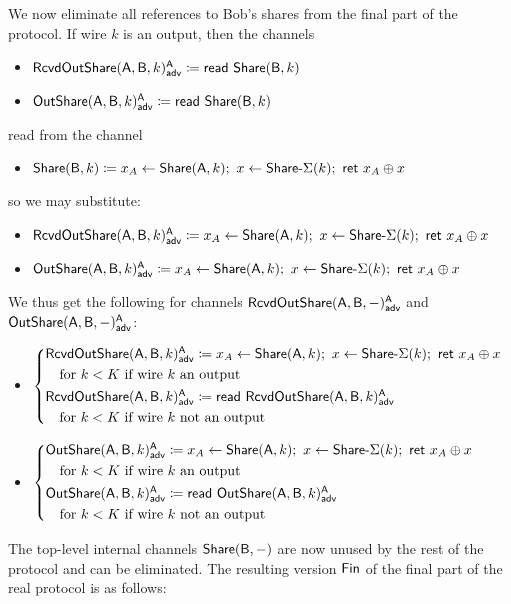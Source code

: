 \noindent We now eliminate all references to Bob's shares from the final part of the protocol. If wire $k$ is an output, then the channels
\begin{itemize}
\item {\color{blue} $\mathsf{RcvdOutShare}(\mathsf{A},\mathsf{B},k)^{\mathsf{A}}_{\mathsf{adv}} \coloneqq \mathsf{read} \ \mathsf{Share}(\mathsf{B},k)$}
\item {\color{blue} $\mathsf{OutShare}(\mathsf{A},\mathsf{B},k)^{\mathsf{A}}_{\mathsf{adv}} \coloneqq \mathsf{read} \ \mathsf{Share}(\mathsf{B},k)$}
\end{itemize}
read from the channel
\begin{itemize}
\item $\mathsf{Share}(\mathsf{B},k) \coloneqq x_A \leftarrow \mathsf{Share}(\mathsf{A},k); \ x \leftarrow \mathsf{Share}\textsf{-}\Sigma(k); \ \mathsf{ret} \ x_A \oplus x$
\end{itemize}
so we may substitute:
\begin{itemize}
\item {\color{blue} $\mathsf{RcvdOutShare}(\mathsf{A},\mathsf{B},k)^{\mathsf{A}}_{\mathsf{adv}} \coloneqq x_A \leftarrow \mathsf{Share}(\mathsf{A},k); \ x \leftarrow \mathsf{Share}\textsf{-}\Sigma(k); \ \mathsf{ret} \ x_A \oplus x$}
\item {\color{blue} $\LeakOutShare(\A,\B,k)^\A_\adv \coloneqq x_A \leftarrow \Share(\A,k); \ x \leftarrow \SumShare(k); \ \ret{x_A \oplus x}$}
\end{itemize}
We thus get the following for channels $\mathsf{RcvdOutShare}(\mathsf{A},\mathsf{B},-)^{\mathsf{A}}_{\mathsf{adv}}$ and $\mathsf{OutShare}(\mathsf{A},\mathsf{B},-)^{\mathsf{A}}_{\mathsf{adv}}$: 
\begin{itemize}
\item {\color{blue} $\begin{cases*} \LeakRcvdOutShare(\A,\B,k)^\A_\adv \coloneqq x_A \leftarrow \Share(\A,k); \ x \leftarrow \SumShare(k); \ \ret{x_A \oplus x} \\ \hspace{10pt} \text{for $k < K$ if wire $k$ an output} \\ \LeakRcvdOutShare(\A,\B,k)^\A_\adv \coloneqq \read{\LeakRcvdOutShare(\A,\B,k)^\A_\adv} \\ \hspace{10pt} \text{for $k < K$ if wire $k$ not an output} \end{cases*}$}
\item {\color{blue} $\begin{cases*} \LeakOutShare(\A,\B,k)^\A_\adv \coloneqq x_A \leftarrow \Share(\A,k); \ x \leftarrow \SumShare(k); \ \ret{x_A \oplus x} \\ \hspace{10pt} \text{for $k < K$ if wire $k$ an output} \\ \LeakOutShare(\A,\B,k)^\A_\adv \coloneqq \read{\LeakOutShare(\A,\B,k)^\A_\adv} \\ \hspace{10pt} \text{for $k < K$ if wire $k$ not an output} \end{cases*}$}
\end{itemize}
The top-level internal channels $\mathsf{Share}(\mathsf{B},-)$ are now unused by the rest of the protocol and can be eliminated. The resulting version $\mathsf{Fin}$ of the final part of the real protocol is as follows:

